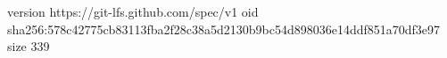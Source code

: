 version https://git-lfs.github.com/spec/v1
oid sha256:578c42775cb83113fba2f28c38a5d2130b9bc54d898036e14ddf851a70df3e97
size 339
